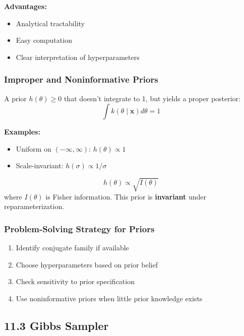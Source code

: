 \textbf{Advantages:}

\begin{itemize}
	\item Analytical tractability
	\item Easy computation
	\item Clear interpretation of hyperparameters
\end{itemize}

\subsubsection{Improper and Noninformative Priors}

\begin{definition}
A prior $h(\theta) \geq 0$ that doesn't integrate to 1, but yields a proper posterior:
\[
\int k(\theta \mid \mathbf{x}) d\theta = 1
\]
\end{definition}
\textbf{Examples:}

\begin{itemize}
	\item Uniform on $(-\infty, \infty)$: $h(\theta) \propto 1$
	\item Scale-invariant: $h(\sigma) \propto 1/\sigma$
\end{itemize}

\begin{definition}
\[
h(\theta) \propto \sqrt{I(\theta)}
\]
where $I(\theta)$ is Fisher information. This prior is \textbf{invariant} under reparameterization.
\end{definition}
\subsubsection{Problem-Solving Strategy for Priors}

\begin{enumerate}
	\item Identify conjugate family if available
	\item Choose hyperparameters based on prior belief
	\item Check sensitivity to prior specification
	\item Use noninformative priors when little prior knowledge exists
\end{enumerate}

\subsection{11.3 Gibbs Sampler}


